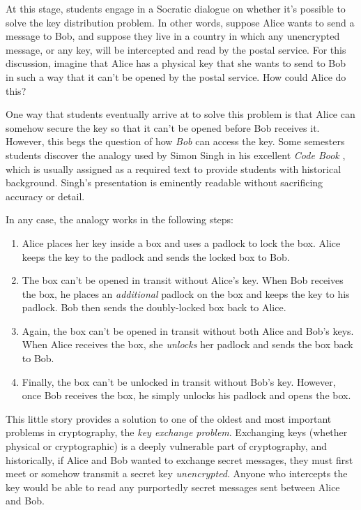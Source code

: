 \documentclass[11pt]{article}
\theoremstyle{plain}
\theoremstyle{remark}
\theoremstyle{definition}
\theoremstyle{definition}
\theoremstyle{definition}
\theoremstyle{plain}
\theoremstyle{plain}
\theoremstyle{plain}
\theoremstyle{definition}
\begin{document}
At this stage, students engage in a Socratic dialogue on whether
it's possible to solve the key distribution problem. In other words,
suppose Alice wants to send a message to Bob, and suppose they live
in a country in which any unencrypted message, or any key, will be
intercepted and read by the postal service. For this discussion, imagine
that Alice has a physical key that she wants to send to Bob in such
a way that it can't be opened by the postal service. How could Alice
do this?

One way that students eventually arrive at to solve this problem
is that Alice can somehow secure the key so that it can't be opened
before Bob receives it. However, this begs the question of how \emph{Bob
}can access the key. Some semesters students discover the analogy
used by Simon Singh in his excellent \emph{Code Book} \cite{singhCodeBookScience2011},
which is usually assigned as a required text to provide students with
historical background. Singh's presentation is eminently readable
without sacrificing accuracy or detail. 

In any case, the analogy works in the following steps:
\begin{enumerate}
\item Alice places her key inside a box and uses a padlock to lock the box.
Alice keeps the key to the padlock and sends the locked box to Bob.
\item The box can't be opened in transit without Alice's key. When Bob receives
the box, he places an \emph{additional }padlock on the box and keeps
the key to his padlock. Bob then sends the doubly-locked box back
to Alice.
\item Again, the box can't be opened in transit without both Alice and Bob's
keys. When Alice receives the box, she \emph{unlocks} her padlock
and sends the box back to Bob.
\item Finally, the box can't be unlocked in transit without Bob's key. However,
once Bob receives the box, he simply unlocks his padlock and opens
the box.
\end{enumerate}
This little story provides a solution to one of the oldest and most
important problems in cryptography, the \textit{key exchange problem}.
Exchanging keys (whether physical or cryptographic) is a deeply vulnerable
part of cryptography, and historically, if Alice and Bob wanted to
exchange secret messages, they must first meet or somehow transmit
a secret key \emph{unencrypted}. Anyone who intercepts the key would
be able to read any purportedly secret messages sent between Alice
and Bob.
\end{document}

